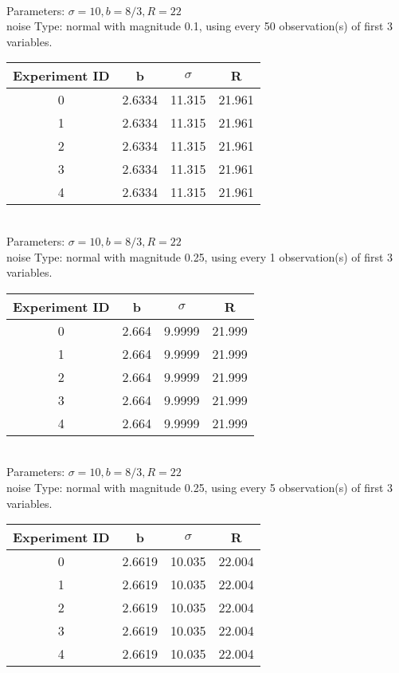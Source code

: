\begin{multicols}{3}
\begin{tabular}{cccc}
 \end{tabular}\\
Parameters: $\sigma=10, b=8/3, R=22$\\
noise Type: normal with magnitude 0.1, using every 50 observation(s) of first 3 variables.\\
\begin{tabular}{cccc}
\hline Experiment ID & b & $\sigma$ & R \\ \hline 
0 & 2.6334 & 11.315 & 21.961\\ \hline 
 1 & 2.6334 & 11.315 & 21.961\\ \hline 
 2 & 2.6334 & 11.315 & 21.961\\ \hline 
 3 & 2.6334 & 11.315 & 21.961\\ \hline 
 4 & 2.6334 & 11.315 & 21.961\\ \hline 
 \end{tabular}\\
Parameters: $\sigma=10, b=8/3, R=22$\\
noise Type: normal with magnitude 0.25, using every 1 observation(s) of first 3 variables.\\
\begin{tabular}{cccc}
\hline Experiment ID & b & $\sigma$ & R \\ \hline 
0 & 2.664 & 9.9999 & 21.999\\ \hline 
 1 & 2.664 & 9.9999 & 21.999\\ \hline 
 2 & 2.664 & 9.9999 & 21.999\\ \hline 
 3 & 2.664 & 9.9999 & 21.999\\ \hline 
 4 & 2.664 & 9.9999 & 21.999\\ \hline 
 \end{tabular}\\
Parameters: $\sigma=10, b=8/3, R=22$\\
noise Type: normal with magnitude 0.25, using every 5 observation(s) of first 3 variables.\\
\begin{tabular}{cccc}
\hline Experiment ID & b & $\sigma$ & R \\ \hline 
0 & 2.6619 & 10.035 & 22.004\\ \hline 
 1 & 2.6619 & 10.035 & 22.004\\ \hline 
 2 & 2.6619 & 10.035 & 22.004\\ \hline 
 3 & 2.6619 & 10.035 & 22.004\\ \hline 
 4 & 2.6619 & 10.035 & 22.004\\ \hline 
 \end{tabular}\\

\end{multicols}
